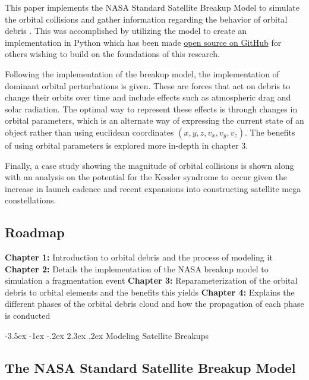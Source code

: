 \documentclass[a4paper, 12pt]{article}
\makeatletter
\renewcommand\section{\clearpage\newpage\@startsection {section}{1}{\z@}%
	{-3.5ex \@plus -1ex \@minus -.2ex}%
	{2.3ex \@plus.2ex}%
	{\normalfont\Large\bfseries}}
\makeatother
\begin{document}
This paper implements the NASA Standard Satellite Breakup Model to simulate the orbital collisions and gather information regarding the behavior of orbital debris \citep{johnson_nasas_2001}. This was accomplished by utilizing the model to create an implementation in Python which has been made \href{https://github.com/ReeceHumphreys/OrbitalDebris}{open source on GitHub} for others wishing to build on the foundations of this research.

Following the implementation of the breakup model, the implementation of dominant orbital perturbations is given. These are forces that act on debris to change their orbits over time and include effects such as atmospheric drag and solar radiation. The optimal way to represent these effects is through changes in orbital parameters, which is an alternate way of expressing the current state of an object rather than using euclidean coordinates $(x,y,z, v_x, v_y, v_z)$. The benefits of using orbital parameters is explored more in-depth in chapter 3.

Finally, a case study showing the magnitude of orbital collisions is shown along with an analysis on the potential for the Kessler syndrome to occur given the increase in launch cadence and recent expansions into constructing satellite mega constellations.

\subsection{Roadmap}
\textbf{Chapter 1:}  Introduction to orbital debris and the process of modeling it \newline 
\textbf{Chapter 2:} Details the implementation of the NASA breakup model to simulation a fragmentation event \newline 
\textbf{Chapter 3:} Reparameterization of the orbital debris to orbital elements and the benefits this yields  \newline 
\textbf{Chapter 4:} Explains the different phases of the orbital debris cloud and how the propagation of each phase is conducted  \newline 
\singlespace

\section{Modeling Satellite Breakups}
\label{Modeling Satellite Breakups}
\doublespace


\subsection{The NASA Standard Satellite Breakup Model}
\end{document}
